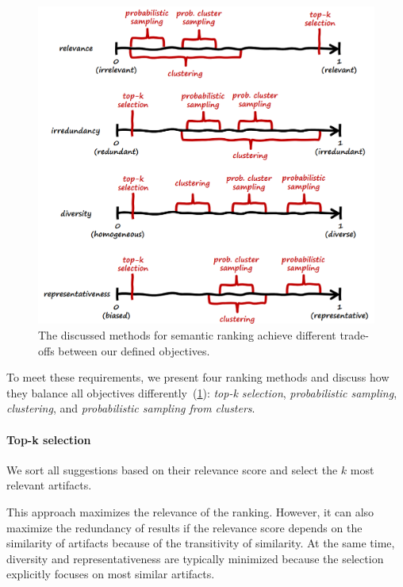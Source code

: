 \begin{figure}[b]
	\centering
	\includegraphics[width=\textwidth]{03_ranking/method_objectives.png}
	\caption[Different methods for semantic ranking achieve different trade-offs between our defined objectives.]{
		The discussed methods for semantic ranking achieve different trade-offs between our defined objectives.
	}
	\label{fig:suggestions/ranking/method_objectives}
\end{figure}

\noindent
To meet these requirements, we present four ranking methods and discuss how they balance all objectives differently~(\cref{fig:suggestions/ranking/method_objectives}): \emph{top-k selection}, \emph{probabilistic sampling}, \emph{clustering}, and \emph{probabilistic sampling from clusters}.

\paragraph{Top-k selection}
We sort all suggestions based on their relevance score and select the $k$ most relevant artifacts.

This approach maximizes the relevance of the ranking.
However, it can also maximize the redundancy of results if the relevance score depends on the similarity of artifacts because of the transitivity of similarity.
At the same time, diversity and representativeness are typically minimized because the selection explicitly focuses on most similar artifacts.

